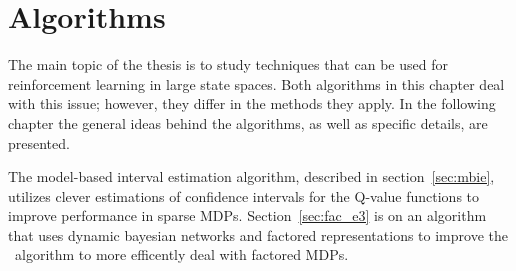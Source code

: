 \chapter{Algorithms}
\label{ch:algo}

The main topic of the thesis is to study techniques that can be used for
reinforcement learning in large state spaces. Both algorithms in this chapter deal with this
issue; however, they differ in the methods they apply. In the following chapter
the general ideas behind the algorithms, as well as specific details, are
presented. 

The model-based interval estimation algorithm, described in
section~\ref{sec:mbie}, utilizes clever estimations of confidence intervals for
the Q-value functions to improve performance in sparse MDPs.
Section~\ref{sec:fac_e3} is on an algorithm that uses dynamic bayesian networks
and factored representations to improve the \etre\ algorithm to more efficently
deal with factored MDPs. 



